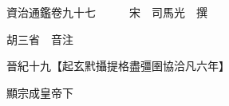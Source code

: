 










 


 
 


 

  
  
  
  
  





  
  
  
  
  
 
  

  

  
  
  



  

 
 

  
   




  

  
  


  　　資治通鑑卷九十七　　　宋　司馬光　撰

　　胡三省　音注

　　晉紀十九【起玄黓攝提格盡彊圉協洽凡六年】

　　顯宗成皇帝下

